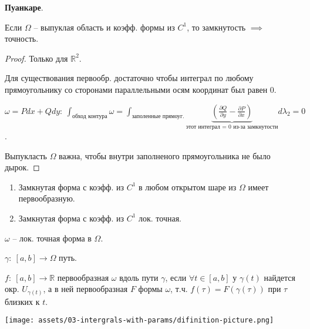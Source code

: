 \begin{lemma}
    \textbf{Пуанкаре}.

    Если $\Omega$ -- выпуклая область и коэфф. формы из $C^1$, то замкнутость $\implies$ точность.
\end{lemma}
\begin{proof}
    Только для $\mathbb{R}^2$.

    Для существования первообр. достаточно чтобы интеграл по любому прямоугольнику со сторонами параллельными осям координат был равен 0.
    
    $\omega = P dx + Q dy: \ \int_{\text{обход контура}} { \omega } = \int_{\text{заполенные прямоуг.}} { \underbrace{(\frac{\partial Q}{\partial y} - \frac{\partial P}{\partial x})}_{\text{этот интеграл = 0 из-за замкнутости}} d \lambda_2} = 0$.

    Выпукласть $\Omega$ важна, чтобы внутри заполненого прямоугольника не было дырок.
\end{proof}

\begin{consequence}
    \begin{enumerate}
        \item {
            Замкнутая форма с коэфф. из $C^1$ в любом открытом шаре из $\Omega$ имеет первообразную.
        }
        \item {
            Замкнутая форма с коэфф. из $C^1$ лок. точная.
        }
    \end{enumerate}
\end{consequence}
\begin{definition}
    $\omega$ -- лок. точная форма в $\Omega$.

    $\gamma: \ [a, b] \rightarrow \Omega$ путь.

    $f: \ [a, b] \rightarrow \mathbb{R}$ первообразная $\omega$ вдоль пути $\gamma$, если $\forall t \in [a, b]$ у $\gamma(t)$ найдется окр. $U_{\gamma(t)}$, а в ней первообразная $F$ формы $\omega$, т.ч. $f(\tau) = F(\gamma(\tau))$ при $\tau$ близких к $t$.

    \begin{center}
        \texttt{[image: assets/03-intergrals-with-params/difinition-picture.png]}
    \end{center}
\end{definition}

